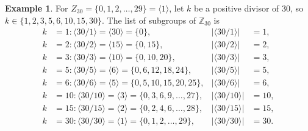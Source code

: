 \documentclass{article}
\theoremstyle{definition}
\newtheorem{example}{Example}[section]
\begin{document}
\begin{example}
    For $Z_{30} = \{0,1,2,\dots,29\} = \langle 1 \rangle$, let $k$ be a positive divisor of 30, so $k \in \{1,2,3,5,6,10,15,30\}$. The list of subgroups of $\mathbb{Z}_{30}$ is 
    \begin{align*}
        k&=1: \langle 30/1 \rangle = \langle 30 \rangle = \{0\}, & |\langle 30/1 \rangle| &= 1, \\
        k&=2: \langle 30/2 \rangle = \langle 15 \rangle = \{0,15\}, & |\langle 30/2 \rangle| &= 2, \\
        k&=3: \langle 30/3 \rangle = \langle 10 \rangle = \{0,10,20\}, & |\langle 30/3 \rangle| &= 3,  \\
        k&=5: \langle 30/5 \rangle = \langle 6 \rangle = \{0,6,12,18,24\}, & |\langle 30/5 \rangle| &= 5, \\
        k&=6: \langle 30/6 \rangle = \langle 5 \rangle = \{0,5,10,15,20,25\}, & |\langle 30/6 \rangle| &= 6, \\
        k&=10: \langle 30/10 \rangle = \langle 3 \rangle = \{0,3,6,9,\dots,27\}, & |\langle 30/10 \rangle| &= 10, \\
        k&=15: \langle 30/15 \rangle = \langle 2 \rangle = \{0,2,4,6,\dots,28\}, & |\langle 30/15 \rangle| &= 15, \\
        k&=30: \langle 30/30 \rangle = \langle 1 \rangle = \{0,1,2,\dots,29\}, & |\langle 30/30 \rangle| &= 30.
    \end{align*}
\end{example}
\end{document}

